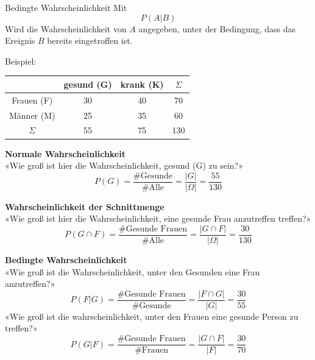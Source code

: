 \begin{multicols}{2}
\begin{definition*}{Bedingte Wahrscheinlichkeit}{}
Mit
$$P(A|B)$$
Wird die Wahrscheinlichkeit von $A$ angegeben, unter der Bedingung,
dass das Ereignis $B$ bereits eingetroffen ist.
\end{definition*}

Beispiel:

\begin{tabular}{c|c|c|c}
           & gesund (G)& krank (K)& $\Sigma$ \\\hline
Frauen (F) &        30 &       40 &       70 \\\hline
Männer (M) &        25 &       35 &       60 \\\hline
$\Sigma$   &        55 &       75 &      130 \\\hline
 \end{tabular}

\textbf{Normale Wahrscheinlichkeit}\\
«Wie groß ist hier die Wahrscheinlichkeit, gesund (G) zu sein?»
$$P(G) = \frac{\textrm{\#Gesunde}}{\textrm{\#Alle}} = \frac{|G|}{|\Omega|} = \frac{55}{130}$$

\textbf{Wahrscheinlichkeit der Schnittmenge}\\
«Wie groß ist hier die Wahrscheinlichkeit, eine gesunde Frau anzutreffen treffen?»
$$P(G\cap F) = \frac{\textrm{\#Gesunde Frauen}}{\textrm{\#Alle}}=\frac{|G\cap F|}{|\Omega|} = \frac{30}{130}$$

\textbf{Bedingte Wahrscheinlichkeit}\\
«Wie groß ist die Wahrscheinlichkeit, unter den Gesunden eine Frau anzutreffen?»
$$P(F | G) = \frac{\textrm{\#Gesunde Frauen}}{\textrm{\#Gesunde}} = \frac{|F\cap G|}{|G|} = \frac{30}{55}$$
«Wie groß ist die wahrscheinlichkeit, unter den Frauen eine gesunde Person zu treffen?»
$$P(G | F) = \frac{\textrm{\#Gesunde Frauen}}{\textrm{\#Frauen}}= \frac{|G \cap F|}{|F|} = \frac{30}{70}$$


\end{multicols}


\newpage





